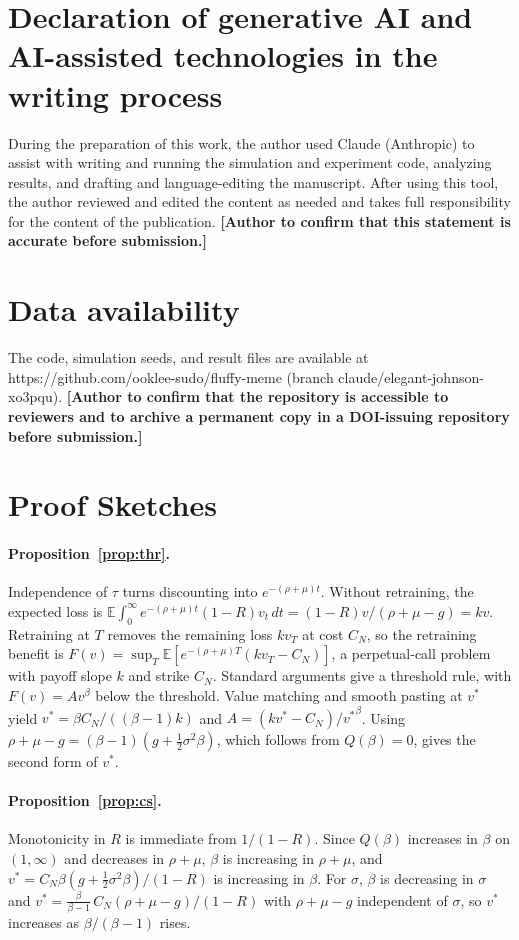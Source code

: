 \documentclass[preprint,12pt,authoryear]{elsarticle}
\newcommand{\E}{\mathbb{E}}
\begin{document}
\section*{Declaration of generative AI and AI-assisted technologies in the writing process}
During the preparation of this work, the author used Claude (Anthropic) to assist with writing and running the simulation and experiment code, analyzing results, and drafting and language-editing the manuscript. After using this tool, the author reviewed and edited the content as needed and takes full responsibility for the content of the publication. \textbf{[Author to confirm that this statement is accurate before submission.]}

\section*{Data availability}
The code, simulation seeds, and result files are available at https://github.com/ooklee-sudo/fluffy-meme (branch claude/elegant-johnson-xo3pqu). \textbf{[Author to confirm that the repository is accessible to reviewers and to archive a permanent copy in a DOI-issuing repository before submission.]}

\appendix
\section{Proof Sketches}\label{app:proofs}

\paragraph{Proposition~\ref{prop:thr}.} Independence of $\tau$ turns discounting into $e^{-(\rho+\mu)t}$. Without
retraining, the expected loss is $\E\int_0^\infty e^{-(\rho+\mu)t}(1-R)v_t\,dt=(1-R)v/(\rho+\mu-g)=kv$. Retraining at $T$
removes the remaining loss $kv_T$ at cost $C_N$, so the retraining benefit is
$F(v)=\sup_T\E[e^{-(\rho+\mu)T}(kv_T-C_N)]$, a perpetual-call problem with payoff slope $k$ and strike $C_N$. Standard
arguments \citep{dixit1994investment} give a threshold rule, with $F(v)=Av^\beta$ below the threshold. Value matching
and smooth pasting at $v^*$ yield $v^*=\beta C_N/((\beta-1)k)$ and $A=(kv^*-C_N)/{v^*}^\beta$. Using
$\rho+\mu-g=(\beta-1)(g+\tfrac12\sigma^2\beta)$, which follows from $Q(\beta)=0$, gives the second form of $v^*$.

\paragraph{Proposition~\ref{prop:cs}.} Monotonicity in $R$ is immediate from $1/(1-R)$. Since $Q(\beta)$ increases in
$\beta$ on $(1,\infty)$ and decreases in $\rho+\mu$, $\beta$ is increasing in $\rho+\mu$, and
$v^*=C_N\beta(g+\tfrac12\sigma^2\beta)/(1-R)$ is increasing in $\beta$. For $\sigma$, $\beta$ is decreasing in $\sigma$ and
$v^*=\frac{\beta}{\beta-1}\,C_N(\rho+\mu-g)/(1-R)$ with $\rho+\mu-g$ independent of $\sigma$, so $v^*$ increases as
$\beta/(\beta-1)$ rises.
\end{document}
